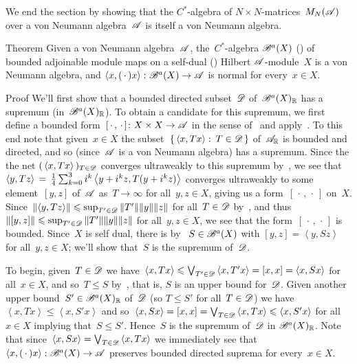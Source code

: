 \documentclass[a]{subfiles}
\begin{document}
\begin{parsec}%
\begin{point}%
We end the section
by showing that the $C^*$-algebra
of $N\times N$-matrices~$M_N(\mathscr{A})$
over a von Neumann algebra~$\mathscr{A}$
is itself a von Neumann algebra.
\end{point}
\begin{point}[bah-vn]{Theorem}%
Given a von Neumann algebra~$\mathscr{A}$,
the~$C^*$-algebra $\mathscr{B}^a(X)$ ()
of bounded adjoinable module maps on
a self-dual () Hilbert $\mathscr{A}$-module~$X$
is a  von Neumann algebra,
and
$\left<x,(\,\cdot\,)x\right>\colon \mathscr{B}^a(X)\to\mathscr{A}$
is normal for every~$x\in X$.
\begin{point}{Proof}%
We'll first show that
a  bounded directed subset~$\mathscr{D}$ of~$\mathscr{B}^a(X)_{\mathbb{R}}$
has a supremum (in~$\mathscr{B}^a(X)_{\mathbb{R}}$).
To obtain a candidate for this supremum,
we first define
a bounded form~$[\,\cdot\,,\,\cdot\,]\colon X\times X\to\mathscr{A}$
in the sense of~
and apply~.
To this end note that given~$x\in X$
the subset~$\{\,\left<x,Tx\right>\colon \, T\in\mathscr{D}\,\}$
of~$\mathscr{A}_{\mathbb{R}}$
is bounded and directed,
and so 
(since~$\mathscr{A}$ is a von Neumann algebra)
has a supremum.
Since the 
the net $(\,\left<x,Tx\right>\,)_{T\in \mathscr{D}}$
converges ultraweakly to this supremum
by~,
we see that
$\left<y,Tz\right>\,= \,\frac{1}{4}
\sum_{k=0}^3
i^k\left<y+i^kz,\smash{T(y+i^kz)}\right>$
converges ultraweakly to 
some element~$[y,z]$ of~$\mathscr{A}$
as~$T\to\infty$ for all~$y,z\in X$,
giving us a form~$[\,\cdot\,,\,\cdot\,]$ on~$X$.
Since~$\left\|\left<y,T z \right>\right\|
\leqslant \sup_{T'\in \mathscr{D}} \|T'\| \|y\|\|z\|$
for all~$T\in\mathscr{D}$
by~,
and thus~$\|[y,z]\|\leqslant \sup_{T'\in\mathscr{D}} \|T'\|\|y\|\|z\|$
for all~$y,z\in X$,
we see that the form~$[\,\cdot\,,\,\cdot\,]$
is bounded.
Since~$X$ is self dual,
there is
by~
$S\in \mathscr{B}^a(X)$
with
$[y,z]=\left<y,Sz\right>$
for all~$y,z\in X$;
we'll show that~$S$ is the supremum of~$\mathscr{D}$.

To begin,
given~$T\in\mathscr{D}$
we have~$\left<x,Tx\right>\leqslant\bigvee_{T'\in\mathscr{D}} \left<x,T'x\right>
=[x,x]=\left<x,Sx\right>$
for all~$x\in X$,
and so~$T\leq S$
by~,
that is, $S$ is an upper bound for~$\mathscr{D}$.
Given another upper bound~$S'\in\mathscr{B}^a(X)_{\mathbb{R}}$
of~$\mathscr{D}$
(so  $T\leq S'$ for all~$T\in\mathscr{D}$)
we have~$\left<x,Tx\right>\leq \left<x,S'x\right>$
and so~$\left<x,Sx\right>
=[x,x]=\bigvee_{T\in \mathscr{D}}\left<x,Tx\right>\leqslant \left<x,S'x\right>$
for all~$x\in X$
implying that~$S\leq S'$.
Hence~$S$ is the supremum of~$\mathscr{D}$
in $\mathscr{B}^a(X)_{\mathbb{R}}$.
Note that since~$\left<x,Sx\right>=\bigvee_{T\in\mathscr{D}} \left<x,Tx\right>$
we immediately see
that $\left<x,(\,\cdot\,)x\right>\colon \mathscr{B}^a(X)\to\mathscr{A}$
preserves bounded directed suprema
for every~$x\in X$.


\end{point}
\end{point}
\end{parsec}
\end{document}
